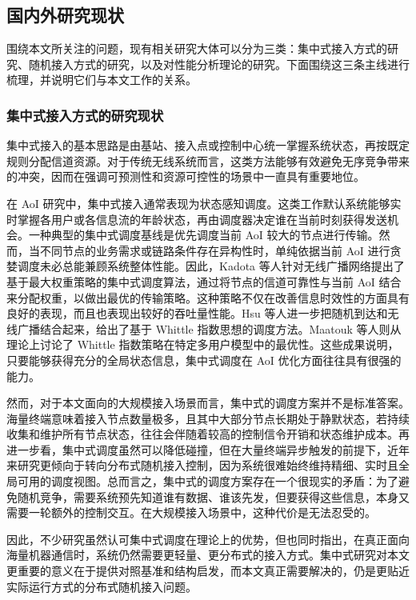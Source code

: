 \subsection{国内外研究现状}

围绕本文所关注的问题，现有相关研究大体可以分为三类：集中式接入方式的研究、随机接入方式的研究，以及对性能分析理论的研究。下面围绕这三条主线进行梳理，并说明它们与本文工作的关系。

\subsubsection{集中式接入方式的研究现状}

集中式接入的基本思路是由基站、接入点或控制中心统一掌握系统状态，再按既定规则分配信道资源。对于传统无线系统而言，这类方法能够有效避免无序竞争带来的冲突，因而在强调可预测性和资源可控性的场景中一直具有重要地位。

在 AoI 研究中，集中式接入通常表现为状态感知调度。这类工作默认系统能够实时掌握各用户或各信息流的年龄状态，再由调度器决定谁在当前时刻获得发送机会。一种典型的集中式调度基线是优先调度当前 AoI 较大的节点进行传输。然而，当不同节点的业务需求或链路条件存在异构性时，单纯依据当前 AoI 进行贪婪调度未必总能兼顾系统整体性能。因此，Kadota 等人针对无线广播网络提出了基于最大权重策略的集中式调度算法，通过将节点的信道可靠性与当前 AoI 结合来分配权重，以做出最优的传输策略。这种策略不仅在改善信息时效性的方面具有良好的表现，而且也表现出较好的吞吐量性能。Hsu 等人进一步把随机到达和无线广播结合起来，给出了基于 Whittle 指数思想的调度方法。Maatouk 等人则从理论上讨论了 Whittle 指数策略在特定多用户模型中的最优性。这些成果说明，只要能够获得充分的全局状态信息，集中式调度在 AoI 优化方面往往具有很强的能力。

然而，对于本文面向的大规模接入场景而言，集中式的调度方案并不是标准答案。海量终端意味着接入节点数量极多，且其中大部分节点长期处于静默状态，若持续收集和维护所有节点状态，往往会伴随着较高的控制信令开销和状态维护成本。再进一步看，集中式调度虽然可以降低碰撞，但在大量终端异步触发的前提下，近年来研究更倾向于转向分布式随机接入控制，因为系统很难始终维持精细、实时且全局可用的调度视图。总而言之，集中式的调度方案存在一个很现实的矛盾：为了避免随机竞争，需要系统预先知道谁有数据、谁该先发，但要获得这些信息，本身又需要一轮额外的控制交互。在大规模接入场景中，这种代价是无法忍受的。

因此，不少研究虽然认可集中式调度在理论上的优势，但也同时指出，在真正面向海量机器通信时，系统仍然需要更轻量、更分布式的接入方式。集中式研究对本文更重要的意义在于提供对照基准和结构启发，而本文真正需要解决的，仍是更贴近实际运行方式的分布式随机接入问题。

